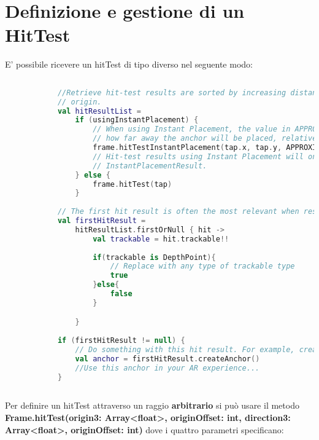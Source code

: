 \documentclass[crop=false, class=book]{standalone}
\begin{document}
	\section{Definizione e gestione di un HitTest}
	E' possibile ricevere un hitTest di tipo diverso nel seguente modo:
	\begin{center}
		\begin{minipage}{1.1\textwidth}
			\begin{lstlisting}[caption={Filtraggio hitTest in base al tipo}, label={lst: hitTest-filter}, language=Kotlin]
			
			//Retrieve hit-test results are sorted by increasing distance from the camera or virtual ray's
			// origin.
			val hitResultList =
  				if (usingInstantPlacement) {
    				// When using Instant Placement, the value in APPROXIMATE DISTANCE METERS will determine
    				// how far away the anchor will be placed, relative to the camera's view.
    				frame.hitTestInstantPlacement(tap.x, tap.y, APPROXIMATE_DISTANCE_METERS)
    				// Hit-test results using Instant Placement will only have one result of type
    				// InstantPlacementResult.
  				} else {
    				frame.hitTest(tap)
  				}
  				
			// The first hit result is often the most relevant when responding to user input.
			val firstHitResult =
  				hitResultList.firstOrNull { hit ->
  					val trackable = hit.trackable!!
  					
  					if(trackable is DepthPoint){
  						// Replace with any type of trackable type
  						true
  					}else{
  						false
  					}

  				}
  				
			if (firstHitResult != null) {
  				// Do something with this hit result. For example, create an anchor at this point of interest.
  				val anchor = firstHitResult.createAnchor()
  				//Use this anchor in your AR experience...
			}
  								
			\end{lstlisting}
		\end{minipage}
	\end{center}
	
	
	\begin{flushleft}
		Per definire un hitTest attraverso un raggio \textbf{arbitrario} si può usare il metodo \textbf{Frame.hitTest(origin3: Array<float>, originOffset: int, direction3: Array<float>, originOffset: int)} dove i quattro parametri 						specificano:
	\end{flushleft}
	
\end{document}
